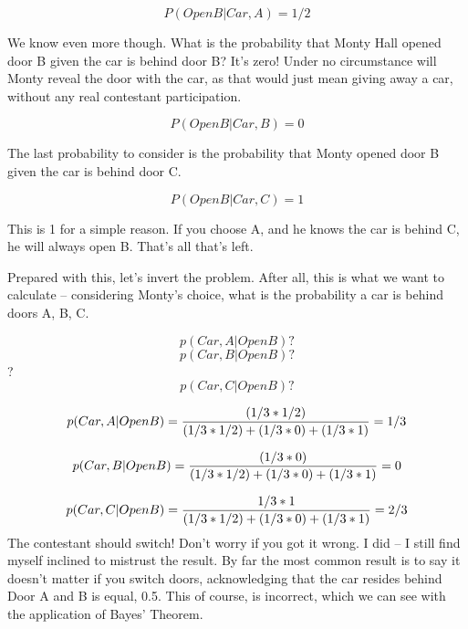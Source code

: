 \documentclass[
]{book}
\begin{document}
\[ P(OpenB | Car, A) = 1/2\]

We know even more though. What is the probability that Monty Hall opened door B given the car is behind door B? It's zero! Under no circumstance will Monty reveal the door with the car, as that would just mean giving away a car, without any real contestant participation.

\[ P(OpenB | Car, B) = 0\]

The last probability to consider is the probability that Monty opened door B given the car is behind door C.

\[ P(OpenB | Car, C) = 1 \]

This is 1 for a simple reason. If you choose A, and he knows the car is behind C, he will always open B. That's all that's left.

Prepared with this, let's invert the problem. After all, this is what we want to calculate -- considering Monty's choice, what is the probability a car is behind doors A, B, C.

\[p(Car,A|OpenB)?\] \[p(Car,B|OpenB)?\]? \[p(Car,C|OpenB)?\]

\[p(Car,A|OpenB) = {{(1/3 * 1/2)}\over{(1/3*1/2)+ (1/3*0) + (1/3*1)}} = 1/3\]

\[p(Car,B|OpenB) = {{(1/3 * 0)}\over{(1/3*1/2)+ (1/3*0) + (1/3*1)}}  = 0\]

\[p(Car,C|OpenB) = {{1/3 * 1}\over{(1/3*1/2)+ (1/3*0) + (1/3*1)}}  = 2/3\] The contestant should switch! Don't worry if you got it wrong. I did -- I still find myself inclined to mistrust the result. By far the most common result is to say it doesn't matter if you switch doors, acknowledging that the car resides behind Door A and B is equal, 0.5. This of course, is incorrect, which we can see with the application of Bayes' Theorem.
\end{document}
